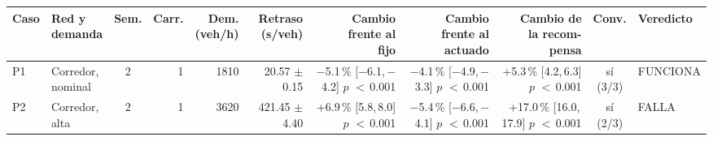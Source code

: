 \begin{table}[H]
\centering
\scriptsize
\setlength{\tabcolsep}{1.5pt}
\begin{tabular}{llcrrrrrrcl}
\toprule
Caso & \makecell[l]{Red y\\demanda} & Sem. & Carr. & \makecell{Dem.\\(veh/h)} & \makecell{Retraso\\(s/veh)} & \makecell{Cambio\\frente al\\fijo} & \makecell{Cambio\\frente al\\actuado} & \makecell{Cambio de\\la recom-\\pensa} & Conv. & Veredicto \\
\midrule
P1 & \makecell[l]{Corredor,\\{}nominal} & 2 & 1 & 1810 & \makecell[r]{20.57\\{}$\pm$ 0.15} & \makecell[r]{$-$5.1\,\%\\{}[$-$6.1,\,$-$4.2]\\$p$ $<$\,0.001} & \makecell[r]{$-$4.1\,\%\\{}[$-$4.9,\,$-$3.3]\\$p$ $<$\,0.001} & \makecell[r]{+5.3\,\%\\{}[4.2,\,6.3]\\$p$ $<$\,0.001} & \makecell[c]{sí\\{}(3/3)} & FUNCIONA \\
P2 & \makecell[l]{Corredor,\\{}alta} & 2 & 1 & 3620 & \makecell[r]{421.45\\{}$\pm$ 4.40} & \makecell[r]{+6.9\,\%\\{}[5.8,\,8.0]\\$p$ $<$\,0.001} & \makecell[r]{$-$5.4\,\%\\{}[$-$6.6,\,$-$4.1]\\$p$ $<$\,0.001} & \makecell[r]{+17.0\,\%\\{}[16.0,\,17.9]\\$p$ $<$\,0.001} & \makecell[c]{sí\\{}(2/3)} & FALLA \\

\end{tabular}
\end{table}
